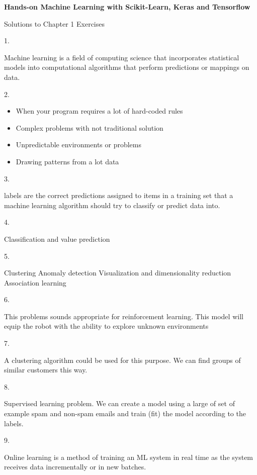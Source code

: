 \documentclass[12]{article}
\begin{document}
\begin{center}
    \Large
    \textbf{Hands-on Machine Learning with Scikit-Learn, Keras and Tensorflow}
        
    \vspace{0.4cm}
    \large
	Solutions to Chapter 1 Exercises
        
\end{center}
1. 

Machine learning is a field of computing science that incorporates statistical models into computational algorithms that perform predictions or mappings on data.

2. 

\begin{itemize}
	\item When your program requires a lot of hard-coded rules
	\item Complex problems with not traditional solution
	\item Unpredictable environments or problems
	\item Drawing patterns from a lot data
\end{itemize}

3.

labels are the correct predictions assigned to items in a training set that a machine learning algorithm should try to classify or predict data into.

4.

Classification and value prediction

5.

Clustering
Anomaly detection
Visualization and dimensionality reduction
Association learning

6.

This problems sounds appropriate for reinforcement learning. This model will equip the robot with the ability to explore unknown environments

7. 

A clustering algorithm could be used for this purpose. We can find groups of similar customers this way.

8. 

Supervised learning problem. We can create a model using a large of set of example spam and non-spam emails and train (fit) the model according to the labels.

9. 

Online learning is a method of training an ML system in real time as the system receives data incrementally or in new batches.
\end{document}
